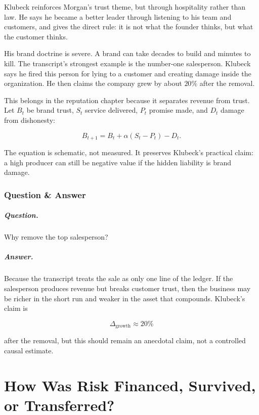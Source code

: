 \documentclass[11pt,oneside]{book}
\begin{document}
Klubeck reinforces Morgan's trust theme, but through hospitality rather than law. He says he became a better leader through listening to his team and customers, and gives the direct rule: it is not what the founder thinks, but what the customer thinks.

His brand doctrine is severe. A brand can take decades to build and minutes to kill. The transcript's strongest example is the number-one salesperson. Klubeck says he fired this person for lying to a customer and creating damage inside the organization. He then claims the company grew by about \(20\%\) after the removal.

This belongs in the reputation chapter because it separates revenue from trust. Let \(B_t\) be brand trust, \(S_t\) service delivered, \(P_t\) promise made, and \(D_t\) damage from dishonesty:

\begin{equation}
B_{t+1}=B_t+\alpha(S_t-P_t)-D_t.
\end{equation}

The equation is schematic, not measured. It preserves Klubeck's practical claim: a high producer can still be negative value if the hidden liability is brand damage.

\subsection{Question \& Answer}

\paragraph{Question.}
Why remove the top salesperson?

\paragraph{Answer.}
Because the transcript treats the sale as only one line of the ledger. If the salesperson produces revenue but breaks customer trust, then the business may be richer in the short run and weaker in the asset that compounds. Klubeck's claim is

\begin{equation}
\Delta_{\mathrm{growth}}\approx 20\%
\end{equation}

after the removal, but this should remain an anecdotal claim, not a controlled causal estimate.

\chapter{How Was Risk Financed, Survived, or Transferred?}
\end{document}
